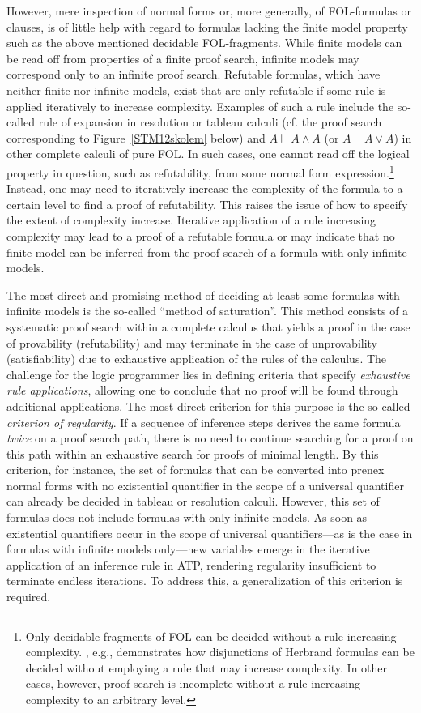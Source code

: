 \documentclass[%
  manuscript=article,   %
  year=2024,
  volume=77,
  doi=00000.000,
]{zfn}
\begin{document}
However, mere inspection of normal forms or, more generally, of FOL-formulas or clauses, is of little help with regard to formulas lacking the finite model property such as the above mentioned decidable FOL-fragments. While finite models can be read off from properties of a finite proof search, infinite models may correspond only to an infinite proof search. Refutable formulas, which have neither finite nor infinite models, exist that are only refutable if some rule is applied iteratively to increase complexity. Examples of such a rule include the so-called rule of expansion in resolution or tableau calculi (cf. the proof search corresponding to Figure~\ref{STM12skolem} below) and $A \vdash A \wedge A$ (or $A \vdash A \vee A$) in other complete calculi of pure FOL. In such cases, one cannot read off the logical property in question, such as refutability, from some normal form expression.\footnote{Only decidable fragments of FOL can be decided without a rule increasing complexity. \parencite{Lampert1}, e.g., demonstrates how disjunctions of Herbrand formulas can be decided without employing a rule that may increase complexity. In other cases, however, proof search is incomplete without a rule increasing complexity to an arbitrary level.} Instead, one may need to iteratively increase the complexity of the formula to a certain level to find a proof of refutability. This raises the issue of how to specify the extent of  complexity increase.
Iterative application of a rule increasing complexity may lead to a proof of a refutable formula or may indicate that no finite model can be inferred from the proof search of a formula with only infinite models.

The most direct and promising method of deciding at least some formulas with infinite models is the so-called ``method of saturation''. This method consists of a systematic proof search within a complete calculus that yields a proof in the case of provability (refutability) and may terminate in the case of unprovability (satisfiability) due to exhaustive application of the rules of the calculus. The challenge for the logic programmer lies in defining criteria that specify \emph{exhaustive rule applications}, allowing one to conclude that no proof will be found through additional applications. The most direct criterion for this purpose is the so-called \emph{criterion of regularity}. If a sequence of inference steps derives the same formula \emph{twice} on a proof search path, there is no need to continue searching for a proof on this path within an exhaustive search for proofs of minimal length. By this criterion, for instance, the set of formulas that can be converted into prenex normal forms with no existential quantifier in the scope of a universal quantifier can already be decided in tableau or resolution calculi. However, this set of formulas does not include formulas with only infinite models. 
As soon as existential quantifiers occur in the scope of universal quantifiers---as is the case in formulas with infinite models only---new variables emerge in the iterative application of an inference rule in ATP, rendering regularity insufficient to terminate endless iterations.
To address this, a generalization of this criterion is required.
\end{document}
